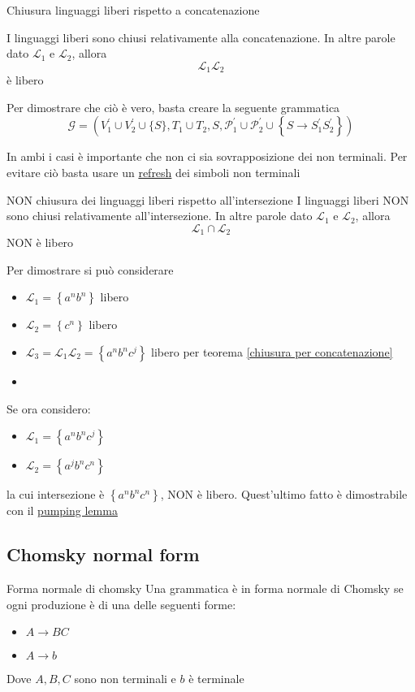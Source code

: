 \begin{teorema}{Chiusura linguaggi liberi rispetto a concatenazione}\label{chiusura per concatenazione}

	I linguaggi liberi sono chiusi relativamente alla concatenazione. In altre parole dato $ \mathcal{L}_1 $ e $ \mathcal{L}_2 $, allora
	\[
		\mathcal{L}_1 \mathcal{L}_2
	\]
	è libero
\end{teorema}
Per dimostrare che ciò è vero, basta creare la seguente grammatica
\[
	\mathcal{G}=\left(V_1^{\prime} \cup V_2^{\prime} \cup\{S\}, T_1 \cup T_2, S, \mathcal{P}_1^{\prime} \cup \mathcal{P}_2^{\prime} \cup\left\{S \rightarrow S_1^{\prime}  S_2^{\prime}\right\}\right)
\]

In ambi i casi è importante che non ci sia sovrapposizione dei non terminali. Per evitare ciò basta usare un \underline{refresh} dei simboli non terminali

\begin{teorema}{NON chiusura dei linguaggi liberi rispetto all'intersezione}
	I linguaggi liberi NON sono chiusi relativamente all'intersezione. In altre parole dato $ \mathcal{L}_1 $ e $ \mathcal{L}_2 $, allora
	\[
		\mathcal{L}_1 \cap \mathcal{L}_2
	\]
	NON è libero
\end{teorema}
Per dimostrare si può considerare
\begin{itemize}
	\item $ \mathcal{L_1} = \left\{a^{n}b^{n}\right\} $ libero
	\item $ \mathcal{L_2} = \left\{c^{n}\right\} $ libero
	\item $ \mathcal{L}_3 = \mathcal{L}_1 \mathcal{L}_2 = \left\{a^{n}b^{n} c^{j}\right\}$ libero per teorema \ref{chiusura per concatenazione}
	\item

\end{itemize}
Se ora considero:
\begin{itemize}
	\item  $ \mathcal{L}_1 = \left\{a^{n}b^{n} c^{j}\right\}$
	\item  $ \mathcal{L}_2 = \left\{a^{j}b^{n}c^{n}\right\}$
\end{itemize}
la cui intersezione è $ \left\{a^{n}b^{n}c^{n}\right\} $, NON è libero. Quest'ultimo fatto è dimostrabile con il \hyperref[pumping lemma]{pumping lemma}


\subsection{Chomsky normal form}\label{chomsky normal form}
\begin{definizione}{Forma normale di chomsky}
	Una grammatica è in forma normale di Chomsky se ogni produzione è di una delle seguenti forme:
	\begin{itemize}
		\item $ A \rightarrow BC $
		\item $ A \rightarrow b $
	\end{itemize}
	Dove $ A, B, C $ sono non terminali e $ b $ è terminale
\end{definizione}
